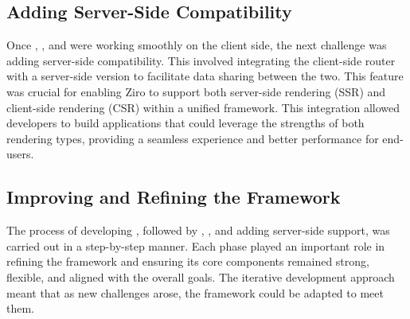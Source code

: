 \subsection{Adding Server-Side Compatibility}
Once , , and  were working smoothly on the client side, the next challenge was adding server-side compatibility. This involved integrating the client-side router with a server-side version to facilitate data sharing between the two. This feature was crucial for enabling Ziro to support both server-side rendering (SSR) and client-side rendering (CSR) within a unified framework. This integration allowed developers to build applications that could leverage the strengths of both rendering types, providing a seamless experience and better performance for end-users.


\subsection{Improving and Refining the Framework}

The process of developing , followed by , , and adding server-side support, was carried out in a step-by-step manner. Each phase played an important role in refining the framework and ensuring its core components remained strong, flexible, and aligned with the overall goals. The iterative development approach meant that as new challenges arose, the framework could be adapted to meet them.


\pagebreak
